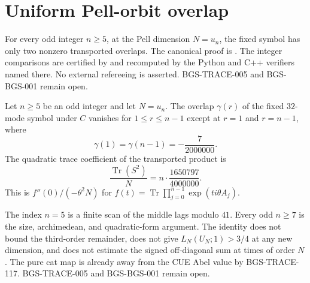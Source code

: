 \section{Uniform Pell-orbit overlap}
\label{sec:uniform-orbit-overlap}
For every odd integer \(n\ge5\), at the Pell dimension \(N=u_n\), the fixed
symbol has only two nonzero transported overlaps. The canonical proof is
.
The integer comparisons are certified by
 and recomputed by the
Python and C++ verifiers named there. No external refereeing is asserted.
BGS-TRACE-005 and BGS-BGS-001 remain open.

\begin{theorem}
\label{thm:uniform-orbit-overlap}
Let \(n\ge5\) be an odd integer and let \(N=u_n\). The overlap \(\gamma(r)\) of
the fixed \(32\)-mode symbol under \(C\) vanishes for \(1\le r\le n-1\) except
at \(r=1\) and \(r=n-1\), where
\[
\gamma(1)=\gamma(n-1)=-\frac7{2000000}.
\]
The quadratic trace coefficient of the transported product is
\[
\frac{\operatorname{Tr}(S^2)}{N}=n\cdot\frac{1650797}{4000000}.
\]
This is \(f''(0)/(-\theta^2 N)\) for
\(f(t)=\operatorname{Tr}\prod_{j=0}^{n-1}\exp(ti\theta A_j)\).

The index \(n=5\) is a finite scan of the middle lags modulo \(41\). Every
odd \(n\ge7\) is the size, archimedean, and quadratic-form argument. The
identity does not bound the third-order remainder, does not give
\(L_N(U_N;1)>3/4\) at any new dimension, and does not estimate the signed
off-diagonal sum at times of order \(N\). The pure cat map is already away
from the CUE Abel value by BGS-TRACE-117. BGS-TRACE-005 and BGS-BGS-001
remain open.
\end{theorem}
